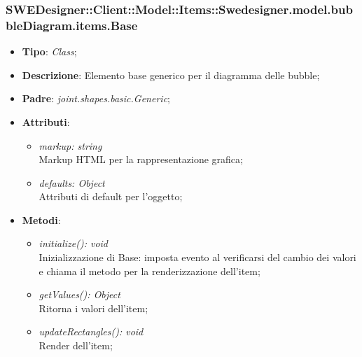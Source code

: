 \documentclass[../DefinizioneDiProdotto.tex]{subfiles}
\begin{document}
			
			\subsubsection{SWEDesigner::Client::Model::Items::Swedesigner.model.bubbleDiagram.items.Base}
			\hypertarget{SWEDesigner::Client::Model::Items::Swedesigner.model.bubbleDiagram.items.Base}{}
			\begin{itemize}
				\item \textbf{Tipo}: \emph{Class};
				\item \textbf{Descrizione}: Elemento base generico per il diagramma delle bubble;
				\item \textbf{Padre}: \emph{joint.shapes.basic.Generic};
				\item \textbf{Attributi}:
				\begin{itemize}
					\item \emph{markup: string}\\
					Markup HTML per la rappresentazione grafica;
					\item \emph{defaults: Object}\\
					Attributi di default per l'oggetto;
				\end{itemize}
				\item \textbf{Metodi}:
				\begin{itemize}
					\item \emph{initialize(): void}\\
					Inizializzazione di Base: imposta evento al verificarsi del cambio dei valori e chiama il metodo per la renderizzazione dell'item;
					\item \emph{getValues(): Object}\\
					Ritorna i valori dell'item;
					\item \emph{updateRectangles(): void}\\
					Render dell'item;	
				\end{itemize}
			\end{itemize}
			
\end{document}
